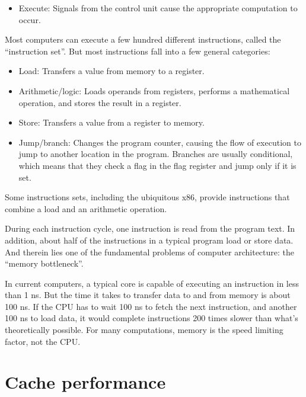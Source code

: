 \documentclass[12pt]{book}
\begin{document}
{\begin{itemize}
\item Execute: Signals from the control unit cause the appropriate
  computation to occur.

\end{itemize}

Most computers can execute a few hundred different instructions,
called the ``instruction set''.  But most instructions fall
into a few general categories:

\begin{itemize}

\item Load: Transfers a value from memory to a register.

\item Arithmetic/logic: Loads operands from registers, performs
a mathematical operation, and stores the result in a register.

\item Store: Transfers a value from a register to memory.

\item Jump/branch: Changes the program counter, causing the flow
of execution to jump to another location in the program.  Branches
are usually conditional, which means that they check a flag
in the flag register and jump only if it is set.

\end{itemize}

Some instructions sets, including the ubiquitous x86, provide
instructions that combine a load and an arithmetic operation.

During each instruction cycle, one instruction is read from the
program text.  In addition, about half of the instructions in a
typical program load or store data.  And therein
lies one of the fundamental problems of computer architecture: the
``memory bottleneck''.

In current computers, a typical core is capable of executing an instruction in less than 1 ns.  But the time it takes to transfer data to and from memory is about 100 ns.  If the CPU has to wait 100 ns to fetch the next instruction, and another 100 ns to load data, it would complete instructions 200 times slower than what's theoretically possible.  For many computations, memory is the speed limiting factor, not the CPU.


\section{Cache performance}

}
\end{document}
